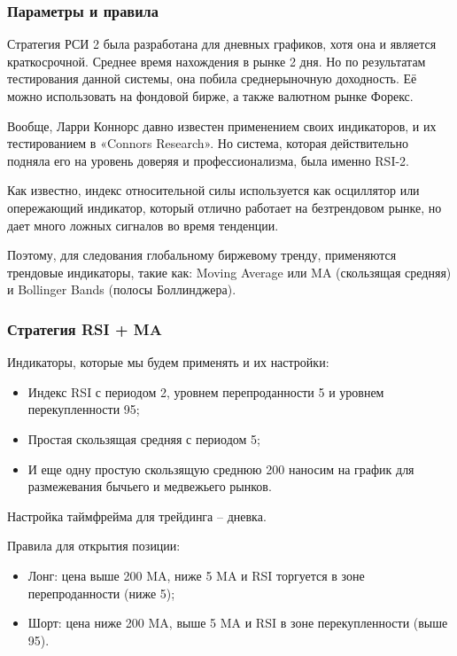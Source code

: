 \documentclass[a5paper]{article}
\begin{document}
\subsubsection{Параметры и правила}

Стратегия РСИ 2 была разработана для дневных графиков, хотя она и является краткосрочной. Среднее время нахождения в рынке 2 дня. Но по результатам тестирования данной системы, она побила среднерыночную доходность. Её можно использовать на фондовой бирже, а также валютном рынке Форекс.

Вообще, Ларри Коннорс давно известен применением своих индикаторов, и их тестированием в «Connors Research». Но система, которая действительно подняла его на уровень доверяя и профессионализма, была именно RSI-2.

Как известно, индекс относительной силы используется как осциллятор или опережающий индикатор, который отлично работает на безтрендовом рынке, но дает много ложных сигналов во время тенденции.

Поэтому, для следования глобальному биржевому тренду, применяются
трендовые индикаторы, такие как: Moving Average или MA (скользящая
средняя) и Bollinger Bands (полосы Боллинджера).

\subsubsection{Стратегия RSI + MA}

Индикаторы, которые мы будем применять и их настройки:
\begin{itemize}
\item     Индекс RSI с периодом 2, уровнем перепроданности 5 и уровнем перекупленности 95;
\item     Простая скользящая средняя с периодом 5;
\item     И еще одну простую скользящую среднюю 200 наносим на график для размежевания бычьего и медвежьего рынков.
\end{itemize}

Настройка таймфрейма для трейдинга – дневка.

Правила для открытия позиции:
\begin{itemize}
\item     Лонг: цена выше 200 MA, ниже 5 MA и RSI торгуется в зоне перепроданности (ниже 5);
\item     Шорт: цена ниже 200 MA, выше 5 MA и RSI в зоне перекупленности (выше 95).
\end{itemize}
\end{document}
